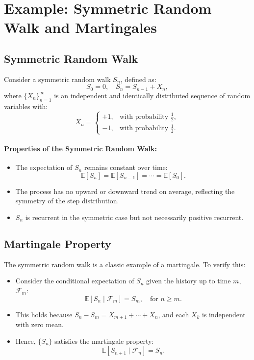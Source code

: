 \section{Example: Symmetric Random Walk and Martingales}

\subsection{Symmetric Random Walk}
Consider a symmetric random walk \( S_n \), defined as:
\[
S_0 = 0, \quad S_n = S_{n-1} + X_n,
\]
where \( \{X_n\}_{n=1}^\infty \) is an independent and identically distributed sequence of random variables with:
\[
X_n =
\begin{cases}
+1, & \text{with probability } \frac{1}{2}, \\
-1, & \text{with probability } \frac{1}{2}.
\end{cases}
\]

\paragraph{Properties of the Symmetric Random Walk:}
\begin{itemize}
    \item The expectation of \( S_n \) remains constant over time:
    \[
    \mathbb{E}[S_n] = \mathbb{E}[S_{n-1}] = \cdots = \mathbb{E}[S_0].
    \]
    \item The process has no upward or downward trend on average, reflecting the symmetry of the step distribution.
    \item \( S_n \) is recurrent in the symmetric case but not necessarily positive recurrent.
\end{itemize}

\subsection{Martingale Property}
The symmetric random walk is a classic example of a martingale. To verify this:
\begin{itemize}
    \item Consider the conditional expectation of \( S_n \) given the history up to time \( m \), \( \mathcal{F}_m \):
    \[
    \mathbb{E}[S_n \mid \mathcal{F}_m] = S_m, \quad \text{for } n \geq m.
    \]
    \item This holds because \( S_n - S_m = X_{m+1} + \cdots + X_n \), and each \( X_k \) is independent with zero mean.
    \item Hence, \( \{S_n\} \) satisfies the martingale property:
    \[
    \mathbb{E}[S_{n+1} \mid \mathcal{F}_n] = S_n.
    \]
\end{itemize}

